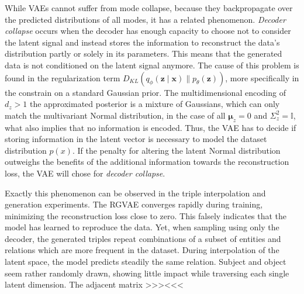 While VAEs cannot suffer from mode collapse, because they backpropagate over the predicted distributions of all modes, it has a related phenomenon. \textit{Decoder collapse} occurs when the decoder has enough capacity to choose not to consider the latent signal and instead stores the information to reconstruct the data's distribution partly or solely in its parameters. This means that the generated data is not conditioned on the latent signal anymore. The cause of this problem is found in the regularization term $D_{K L}\left(q_{{\phi}}\left(\mathbf{z} \mid \mathbf{x}\right) \| p_{{\theta}}(\mathbf{z})\right)$, more specifically in the constrain on a standard Gaussian prior. The multidimensional encoding of $d_z>1$ the approximated posterior is a mixture of Gaussians, which can only match the multivariant Normal distribution, in the case of all $\mathbf{\mu}_z=0$ and $\Sigma^2_z=\mathbb{I}$, what also implies that no information is encoded. Thus, the VAE has to decide if storing information in the latent vector is necessary to model the dataset distribution $p(x)$. If the penalty for altering the latent Normal distribution outweighs the benefits of the additional information towards the reconstruction loss, the VAE will chose for \textit{decoder collapse}. 




Exactly this phenomenon can be observed in the triple interpolation and generation experiments. The RGVAE converges rapidly during training, minimizing the reconstruction loss close to zero. This falsely indicates that the model has learned to reproduce the data. Yet, when sampling using only the decoder, the generated triples repeat combinations of a subset of entities and relations which are more frequent in the dataset. During interpolation of the latent space, the model predicts steadily the same relation. Subject and object seem rather randomly drawn, showing little impact while traversing each single latent dimension. The adjacent matrix >>><<<

